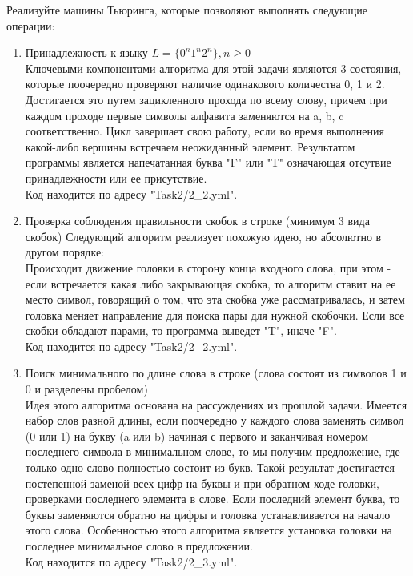 \documentclass{article}
\begin{document}
Реализуйте машины Тьюринга, которые позволяют выполнять следующие операции:
\begin{enumerate}
    \item Принадлежность к языку $L = \{ 0^n1^n2^n \}, n \ge 0$ \\
    Ключевыми компонентами алгоритма для этой задачи являются 3 состояния, которые поочередно проверяют наличие одинакового количества 0, 1 и 2. Достигается это путем зацикленного прохода по всему слову, причем при каждом проходе первые символы алфавита заменяются на a, b, c соответственно. Цикл завершает свою работу, если во время выполнения какой-либо вершины встречаем неожиданный элемент.
    Результатом программы является напечатанная буква "F" или "T" означающая отсутвие принадлежности или ее присутствие.\\
    Код находится по адресу "Task2/2\_2.yml".\\
    \item Проверка соблюдения правильности скобок в строке (минимум 3 вида скобок) 
    Следующий алгоритм реализует похожую идею, но абсолютно в другом порядке:\\
    Происходит движение головки в сторону конца входного слова, при этом - если встречается какая либо закрывающая скобка, то алгоритм ставит на ее место символ, говорящий о том, что эта скобка уже рассматривалась, и затем головка меняет направление для поиска пары для нужной скобочки. Если все скобки обладают парами, то программа выведет "T", иначе "F".\\
    Код находится по адресу "Task2/2\_2.yml".\\
    \item Поиск минимального по длине слова в строке (слова состоят из символов 1 и 0 и разделены пробелом)\\
    Идея этого алгоритма основана на рассуждениях из прошлой задачи. Имеется набор слов разной длины, если поочередно у каждого слова заменять символ (0 или 1) на букву (a или b) начиная с первого и заканчивая номером последнего символа в минимальном слове, то мы получим предложение, где только одно слово полностью состоит из букв. Такой результат достигается постепенной заменой всех цифр на буквы и при обратном ходе головки, проверками последнего элемента в слове. Если последний элемент буква, то буквы заменяются обратно на цифры и головка устанавливается на начало этого слова. Особенностью этого алгоритма является установка головки на последнее минимальное слово в предложении.\\
    Код находится по адресу "Task2/2\_3.yml".\\
\end{enumerate}
\end{document}
